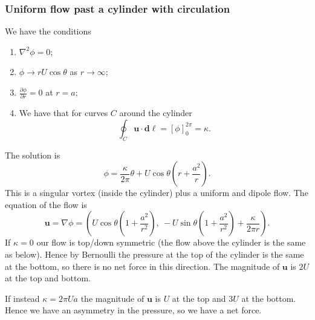 \documentclass{article}
\begin{document}
\subsubsection{Uniform flow past a cylinder with circulation}
We have the conditions
\begin{enumerate}
	\item $ \nabla^2 \phi = 0 $;
	\item $ \phi \to rU\cos\theta $ as $ r\to\infty $;
	\item $\frac{\partial \phi}{\partial r} = 0 $ at $ r=a $;
	\item We have that for curves $ C $ around the cylinder
		\[
			\oint_C \mathbf u \cdot \mathbf d \boldsymbol \ell = [\phi]^{2\pi}_0 = \kappa.
		\]
\end{enumerate}
The solution is
\[
	\phi = \frac{\kappa}{2\pi}\theta + U\cos\theta\left(r+\frac{a^2}r\right).
\]
This is a singular vortex (inside the cylinder) plus a uniform and dipole flow. The equation of the flow is
\[
	\mathbf u = \nabla\phi = \left(U\cos\theta\left(1+\frac{a^2}{r^2}\right),\ -U\sin\theta\left(1+\frac{a^2}{r^2}\right)+ \frac\kappa{2\pi r}\right).
\]
If $ \kappa = 0 $ our flow is top/down symmetric (the flow above the cylinder is the same as below). Hence by Bernoulli the pressure at the top of the cylinder is the same at the bottom, so there is no net force in this direction. The magnitude of $ \mathbf u $ is $ 2U $ at the top and bottom. \par
If instead $ \kappa = 2\pi U a $ the magnitude of $ \mathbf u $ is $ U $ at the top and $ 3U $ at the bottom. Hence we have an asymmetry in the pressure, so we have a net force.
\end{document}
